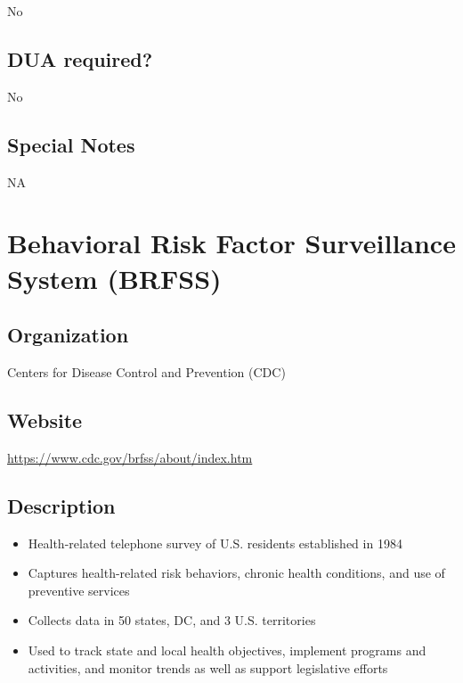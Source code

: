 \documentclass[
]{book}
\providecommand{\tightlist}{%
  \setlength{\itemsep}{0pt}\setlength{\parskip}{0pt}}
\begin{document}
No

\hypertarget{dua-required-10}{%
\section{DUA required?}\label{dua-required-10}}

No

\hypertarget{special-notes-10}{%
\section{Special Notes}\label{special-notes-10}}

NA

\mainmatter

\hypertarget{behavioral-risk-factor-surveillance-system-brfss}{%
\chapter{Behavioral Risk Factor Surveillance System (BRFSS)}\label{behavioral-risk-factor-surveillance-system-brfss}}

\hypertarget{organization-11}{%
\section{Organization}\label{organization-11}}

Centers for Disease Control and Prevention (CDC)

\hypertarget{website-11}{%
\section{Website}\label{website-11}}

\url{https://www.cdc.gov/brfss/about/index.htm}

\hypertarget{description-11}{%
\section{Description}\label{description-11}}

\begin{itemize}
\tightlist
\item
  Health-related telephone survey of U.S. residents established in 1984
\item
  Captures health-related risk behaviors, chronic health conditions, and use of preventive services
\item
  Collects data in 50 states, DC, and 3 U.S. territories
\item
  Used to track state and local health objectives, implement programs and activities, and monitor trends as well as support legislative efforts
\end{itemize}
\end{document}
